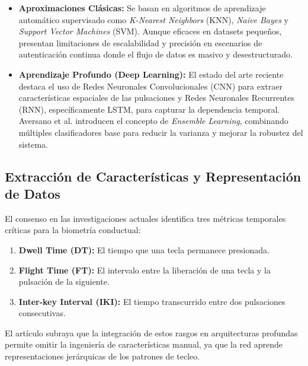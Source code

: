 \begin{itemize}
    \item \textbf{Aproximaciones Clásicas:} Se basan en algoritmos de aprendizaje automático supervisado como \textit{K-Nearest Neighbors} (KNN), \textit{Naive Bayes} y \textit{Support Vector Machines} (SVM). Aunque eficaces en datasets pequeños, presentan limitaciones de escalabilidad y precisión en escenarios de autenticación continua donde el flujo de datos es masivo y desestructurado.
    \item \textbf{Aprendizaje Profundo (Deep Learning):} El estado del arte reciente destaca el uso de Redes Neuronales Convolucionales (CNN) para extraer características espaciales de las pulsaciones y Redes Neuronales Recurrentes (RNN), específicamente LSTM, para capturar la dependencia temporal. Aversano et al. introducen el concepto de \textit{Ensemble Learning}, combinando múltiples clasificadores base para reducir la varianza y mejorar la robustez del sistema.
\end{itemize}

\subsection{Extracción de Características y Representación de Datos}
El consenso en las investigaciones actuales identifica tres métricas temporales críticas para la biometría conductual:
\begin{enumerate}
    \item \textbf{Dwell Time (DT):} El tiempo que una tecla permanece presionada.
    \item \textbf{Flight Time (FT):} El intervalo entre la liberación de una tecla y la pulsación de la siguiente.
    \item \textbf{Inter-key Interval (IKI):} El tiempo transcurrido entre dos pulsaciones consecutivas.
\end{enumerate}
El artículo subraya que la integración de estos rasgos en arquitecturas profundas permite omitir la ingeniería de características manual, ya que la red aprende representaciones jerárquicas de los patrones de tecleo.

